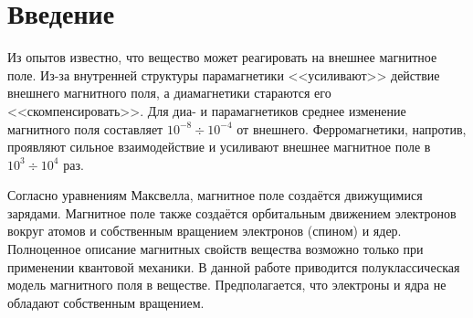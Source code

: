 \section*{Введение}

Из опытов известно, что вещество может реагировать на внешнее магнитное поле. Из-за внутренней структуры парамагнетики <<усиливают>> действие внешнего магнитного поля, а диамагнетики стараются его <<скомпенсировать>>. Для диа- и парамагнетиков среднее изменение магнитного поля составляет $10^{-8} \div 10^{-4}$ от внешнего. Ферромагнетики, напротив, проявляют сильное взаимодействие и усиливают внешнее магнитное поле в $10^3 \div 10^4$ раз.

Согласно уравнениям Максвелла, магнитное поле создаётся движущимися зарядами. Магнитное поле также создаётся орбитальным движением электронов вокруг атомов и собственным вращением электронов (спином) и ядер. Полноценное описание магнитных свойств вещества возможно только при применении квантовой механики. В данной работе приводится полуклассическая модель магнитного поля в веществе. Предполагается, что электроны и ядра не обладают собственным вращением.

